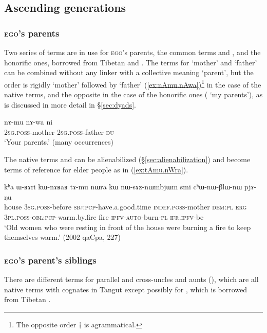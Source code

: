  \subsection{Ascending generations} \label{sec:G+1}
 
 \subsubsection{\textsc{ego}'s parents}
Two series of terms are in use for \textsc{ego}'s parents, the common terms  and , and the honorific ones, borrowed from Tibetan  and . The terms for `mother' and `father' can be combined without any linker with a collective meaning `parent', but the order is rigidly `mother' followed by `father' (\ref{ex:nAmu.nAwa})\footnote{The opposite order $\dagger$ is agrammatical. } in the case of the native terms, and the opposite in the case of the honorific ones  ( `my parents'), as is discussed in more detail in §\ref{sec:dyads}.

\begin{exe}
\ex \label{ex:nAmu.nAwa}
\gll nɤ-mu nɤ-wa ni  \\
\textsc{2sg}.\textsc{poss}-mother \textsc{2sg}.\textsc{poss}-father \textsc{du} \\
\glt  `Your parents.' (many occurrences)
\end{exe}

The native terms   and  can be alienabilized (§\ref{sec:alienabilization}) and become terms of reference for elder people as in (\ref{ex:tAmu.nWra}).

\begin{exe}
\ex \label{ex:tAmu.nWra}
\gll  kʰa ɯ-ʁɤri kɯ-nɤʁaʁ tɤ-mu nɯra kɯ nɯ-sɤz-nɯmbjɯm smi cʰɯ-nɯ-βlɯ-nɯ pjɤ-ŋu  \\
house \textsc{3sg}.\textsc{poss}-before \textsc{sbj}:\textsc{pcp}-have.a.good.time \textsc{indef}.\textsc{poss}-mother \textsc{dem}:\textsc{pl} \textsc{erg} \textsc{3pl}.\textsc{poss}-\textsc{obl}:\textsc{pcp}-warm.by.fire fire \textsc{ipfv}-\textsc{auto}-burn-\textsc{pl} \textsc{ifr}.\textsc{ipfv}-be \\
\glt `Old women who were resting in front of the house were burning a fire to keep themselves warm.' (2002 qaCpa, 227)
\end{exe}
 
 \subsubsection{\textsc{ego}'s parent's siblings} \label{sec:uncle.aunt}
There are different terms for parallel and cross-uncles and aunts (), which are all native terms with cognates in Tangut \citep{jacques11kinship} except possibly for , which is borrowed from Tibetan . 
 

